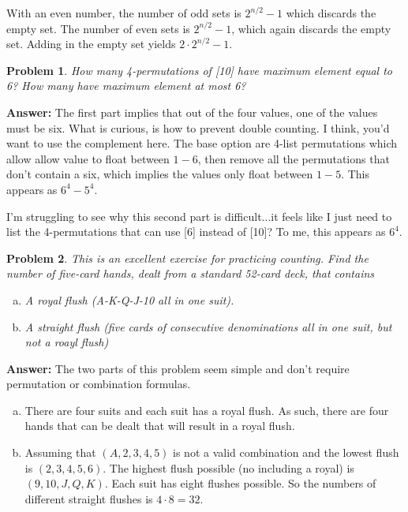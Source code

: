 \documentclass{article}
\theoremstyle{plain}
\newtheorem{problem}{Problem}
\begin{document}
With an even number, the number of odd sets is $2^{n/2}-1$ which discards the empty set. The number of even sets is $2^{n/2}-1$, which again discards the empty set. Adding in the empty set yields $2 \cdot 2^{n/2} - 1$.

\setcounter{problem}{15}
\begin{problem} %
    How many 4-permutations of [10] have maximum element equal to 6? How many have maximum element at most 6?
\end{problem}

\textbf{Answer:}
The first part implies that out of the four values, one of the values must be six. What is curious, is how to prevent double counting. I think, you'd want to use the complement here. The base option are 4-list permutations which allow allow value to float between $1-6$, then remove all the permutations that don't contain a six, which implies the values only float between $1-5$. This appears as $6^{4} - 5^{4}$. \medskip

I'm struggling to see why this second part is difficult...it feels like I just need to list the 4-permutations that can use [6] instead of [10]? To me, this appears as $6^{4}$.

\setcounter{problem}{17}
\begin{problem} %
    This is an excellent exercise for practicing counting. Find the number of five-card hands, dealt from a standard 52-card deck, that contains
    \begin{enumerate}[(a)]
        \item A royal flush (A-K-Q-J-10 all in one suit).
        \item A straight flush (five cards of consecutive denominations all in one suit, but not a roayl flush)
    \end{enumerate}
\end{problem}

\textbf{Answer:}
The two parts of this problem seem simple and don't require permutation or combination formulas.

\begin{enumerate}[(a)]
    \item There are four suits and each suit has a royal flush. As such, there are four hands that can be dealt that will result in a royal flush.
    \item Assuming that $(A, 2, 3, 4, 5)$ is not a valid combination and the lowest flush is $(2, 3, 4, 5, 6)$. The highest flush possible (no including a royal) is $(9, 10, J, Q, K)$. Each suit has eight flushes possible. So the numbers of different straight flushes is $4 \cdot 8 = 32$.
\end{enumerate}
\end{document}
